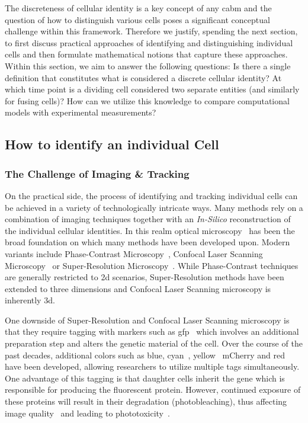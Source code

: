 The discreteness of cellular identity is a key concept of any \ac{cabm} and the question of how to
distinguish various cells poses a significant conceptual challenge within this framework.
Therefore we justify, spending the next section, to first discuss practical approaches of
identifying and distinguishing individual cells and then formulate mathematical notions that capture
these approaches.
Within this section, we aim to answer the following questions:
Is there a single definition that constitutes what is considered a discrete cellular identity?
At which time point is a dividing cell considered two separate entities (and similarly for fusing
cells)?
How can we utilize this knowledge to compare computational models with experimental measurements?

\subsection{How to identify an individual Cell}
\label{subsec:abm-theory-what-is-a-cell}
\subsubsection{The Challenge of Imaging \& Tracking}
\label{subsubsec:imaging-tracking}
On the practical side, the process of identifying and tracking individual cells can be achieved in a
variety of technologically intricate ways.
Many methods rely on a combination of imaging techniques together with an \textit{In-Silico}
reconstruction of the individual cellular identities.
In this realm optical microscopy~\cite{Murphy2012,Wollman2015} has been the broad foundation on
which many methods have been developed upon.
Modern variants include Phase-Contrast Microscopy~\cite{Zernike1942}, Confocal Laser Scanning
Microscopy~\cite{Minsky1988} or Super-Resolution Microscopy~\cite{Hell1994}.
While Phase-Contrast techniques are generally restricted to \ac{2d} scenarios, Super-Resolution
methods have been extended to three dimensions \cite{Huang2008,Schmidt2008} and Confocal Laser
Scanning microscopy is inherently \ac{3d}.

One downside of Super-Resolution and Confocal Laser Scanning microscopy is that they require tagging
with markers such as \ac{gfp}~\cite{Chalfie1994,Kilgard1995} which involves an additional
preparation step and alters the genetic material of the cell.
Over the course of the past decades, additional colors such as blue, cyan~\cite{Heim1994},
yellow~\cite{Orm1996} mCherry and red~\cite{Matz1999,Shaner2004} have been developed, allowing
researchers to utilize multiple tags simultaneously.
One advantage of this tagging is that daughter cells inherit the gene which is responsible for
producing the fluorescent protein.
However, continued exposure of these proteins will result in their degradation (photobleaching),
thus affecting image quality~\cite{Lichtman2005} and leading to phototoxicity~\cite{Icha2017}.


